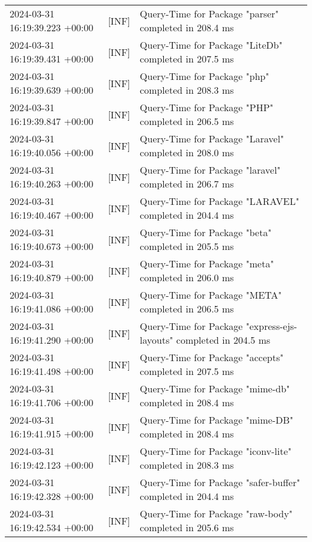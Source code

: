 {{\begin{tabularx}{\textwidth}{|l|l|X|}
                    2024-03-31 16:19:39.223 +00:00 & [INF] & Query-Time for Package "parser" completed in 208.4 ms \\
                    2024-03-31 16:19:39.431 +00:00 & [INF] & Query-Time for Package "LiteDb" completed in 207.5 ms \\
                    2024-03-31 16:19:39.639 +00:00 & [INF] & Query-Time for Package "php" completed in 208.3 ms \\
                    2024-03-31 16:19:39.847 +00:00 & [INF] & Query-Time for Package "PHP" completed in 206.5 ms \\
                    2024-03-31 16:19:40.056 +00:00 & [INF] & Query-Time for Package "Laravel" completed in 208.0 ms \\
                    2024-03-31 16:19:40.263 +00:00 & [INF] & Query-Time for Package "laravel" completed in 206.7 ms \\
                    2024-03-31 16:19:40.467 +00:00 & [INF] & Query-Time for Package "LARAVEL" completed in 204.4 ms \\
                    2024-03-31 16:19:40.673 +00:00 & [INF] & Query-Time for Package "beta" completed in 205.5 ms \\
                    2024-03-31 16:19:40.879 +00:00 & [INF] & Query-Time for Package "meta" completed in 206.0 ms \\
                    2024-03-31 16:19:41.086 +00:00 & [INF] & Query-Time for Package "META" completed in 206.5 ms \\
                    2024-03-31 16:19:41.290 +00:00 & [INF] & Query-Time for Package "express-ejs-layouts" completed in 204.5 ms \\
                    2024-03-31 16:19:41.498 +00:00 & [INF] & Query-Time for Package "accepts" completed in 207.5 ms \\
                    2024-03-31 16:19:41.706 +00:00 & [INF] & Query-Time for Package "mime-db" completed in 208.4 ms \\
                    2024-03-31 16:19:41.915 +00:00 & [INF] & Query-Time for Package "mime-DB" completed in 208.4 ms \\
                    2024-03-31 16:19:42.123 +00:00 & [INF] & Query-Time for Package "iconv-lite" completed in 208.3 ms \\
                    2024-03-31 16:19:42.328 +00:00 & [INF] & Query-Time for Package "safer-buffer" completed in 204.4 ms \\
                    2024-03-31 16:19:42.534 +00:00 & [INF] & Query-Time for Package "raw-body" completed in 205.6 ms \\

\end{tabularx}}}
